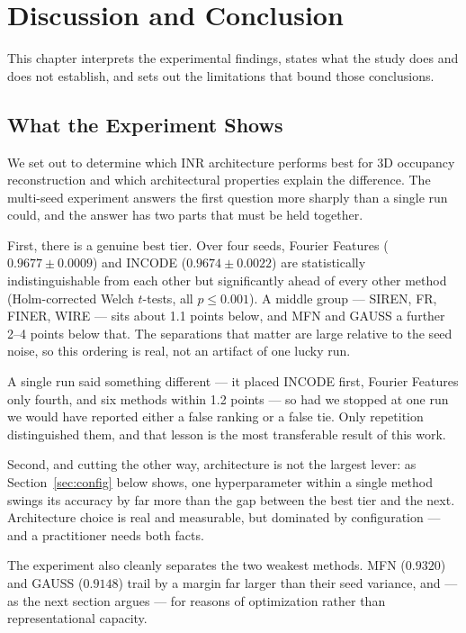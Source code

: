 \chapter{Discussion and Conclusion}
\label{ch:discussion}

This chapter interprets the experimental findings, states what the study does and does not establish, and sets out the limitations that bound those conclusions.

\section{What the Experiment Shows}

We set out to determine which INR architecture performs best for 3D occupancy reconstruction and which architectural properties explain the difference. The multi-seed experiment answers the first question more sharply than a single run could, and the answer has two parts that must be held together.

First, there is a genuine best tier. Over four seeds, Fourier Features ($0.9677 \pm 0.0009$) and INCODE ($0.9674 \pm 0.0022$) are statistically indistinguishable from each other but significantly ahead of every other method (Holm-corrected Welch $t$-tests, all $p \le 0.001$). A middle group --- SIREN, FR, FINER, WIRE --- sits about 1.1 points below, and MFN and GAUSS a further 2--4 points below that. The separations that matter are large relative to the seed noise, so this ordering is real, not an artifact of one lucky run.

A single run said something different --- it placed INCODE first, Fourier Features only fourth, and six methods within 1.2 points --- so had we stopped at one run we would have reported either a false ranking or a false tie. Only repetition distinguished them, and that lesson is the most transferable result of this work.

Second, and cutting the other way, architecture is not the largest lever: as Section~\ref{sec:config} below shows, one hyperparameter within a single method swings its accuracy by far more than the gap between the best tier and the next. Architecture choice is real and measurable, but dominated by configuration --- and a practitioner needs both facts.

The experiment also cleanly separates the two weakest methods. MFN ($0.9320$) and GAUSS ($0.9148$) trail by a margin far larger than their seed variance, and --- as the next section argues --- for reasons of optimization rather than representational capacity.

